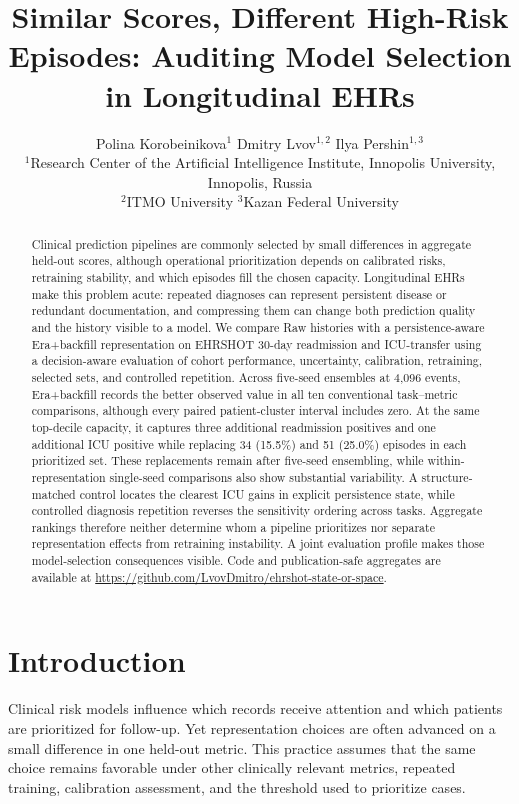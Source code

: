 \documentclass{article}
\title{Similar Scores, Different High-Risk Episodes: Auditing Model Selection in Longitudinal EHRs}
\author{
  Polina Korobeinikova$^{1}$ \quad Dmitry Lvov$^{1,2}$ \quad Ilya Pershin$^{1,3}$\\
  $^{1}$Research Center of the Artificial Intelligence Institute, Innopolis University, Innopolis, Russia\\
  $^{2}$ITMO University \quad $^{3}$Kazan Federal University
}
\begin{document}
\maketitle

\begin{abstract}
Clinical prediction pipelines are commonly selected by small differences in
aggregate held-out scores, although operational prioritization depends on
calibrated risks, retraining stability, and which episodes fill the chosen
capacity. Longitudinal EHRs make this problem acute: repeated diagnoses can
represent persistent disease or redundant documentation, and compressing them
can change both prediction quality and the history visible to a model. We
compare Raw histories with a persistence-aware Era+backfill representation on
EHRSHOT 30-day readmission and ICU-transfer using a decision-aware evaluation
of cohort performance, uncertainty, calibration, retraining, selected sets,
and controlled repetition. Across five-seed ensembles at 4,096 events,
Era+backfill records the better observed value in all ten conventional
task--metric comparisons, although every paired patient-cluster interval
includes zero. At the same top-decile capacity, it captures three additional
readmission positives and one additional ICU positive while replacing 34
(15.5\%) and 51 (25.0\%) episodes in each prioritized set. These replacements
remain after five-seed ensembling, while within-representation single-seed
comparisons also show substantial variability. A structure-matched control
locates the clearest ICU gains in explicit persistence state, while controlled
diagnosis repetition reverses the sensitivity ordering across tasks. Aggregate rankings therefore
neither determine whom a pipeline prioritizes nor separate representation
effects from retraining instability. A joint evaluation profile makes those
model-selection consequences visible. Code and publication-safe aggregates are
available at \url{https://github.com/LvovDmitro/ehrshot-state-or-space}.
\end{abstract}

\section{Introduction}

Clinical risk models influence which records receive attention and which
patients are prioritized for follow-up. Yet representation choices are often
advanced on a small difference in one held-out metric. This practice assumes
that the same choice remains favorable under other clinically relevant metrics,
repeated training, calibration assessment, and the threshold used to prioritize
cases.
\end{document}
